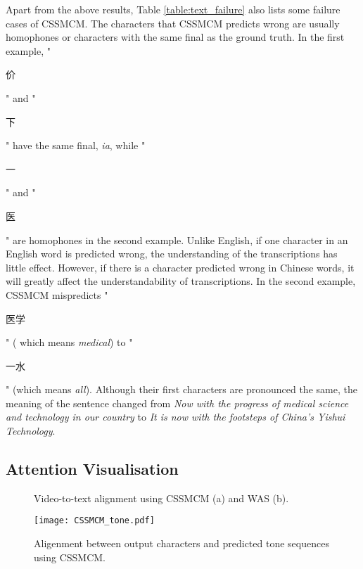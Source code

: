 \documentclass[sigconf]{acmart}
\begin{document}
Apart from the above results, Table \ref{table:text_failure} also lists some failure cases of CSSMCM. The characters that CSSMCM predicts wrong are usually homophones or characters with the same final as the ground truth. In the first example, "\begin{CJK*}{UTF8}{gbsn}价\end{CJK*}" and "\begin{CJK*}{UTF8}{gbsn}下\end{CJK*}" have the same final, \textit{ia}, while "\begin{CJK*}{UTF8}{gbsn}一\end{CJK*}" and "\begin{CJK*}{UTF8}{gbsn}医\end{CJK*}" are homophones in the second example. Unlike English, if one character in an English word is predicted wrong, the understanding of the transcriptions has little effect. However, if there is a character predicted wrong in Chinese words, it will greatly affect the understandability of transcriptions. In the second example, CSSMCM mispredicts "\begin{CJK*}{UTF8}{gbsn}医学\end{CJK*}" ( which means \textit{medical}) to "\begin{CJK*}{UTF8}{gbsn}一水\end{CJK*}" (which means \textit{all}). Although their first characters are pronounced the same, the meaning of the sentence changed from \textit{Now with the progress of medical science and technology in our country} to \textit{It is now with the footsteps of China's Yishui Technology}.

\subsection{Attention Visualisation}
\begin{figure*}[htbp]
\centering
{}\centering
\caption{Video-to-text alignment using CSSMCM (a) and WAS (b).}
\label{fig:video_text_alignment}
\end{figure*}

\begin{figure}[htp]
\centering
\texttt{[image: CSSMCM\_tone.pdf]}
\caption{Aligenment between output characters and predicted tone sequences using CSSMCM.}
\label{fig:CSSMCM_tone}
\end{figure}
\end{document}
